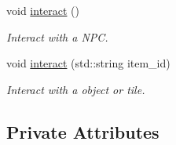 \begin{DoxyCompactItemize}
void \hyperlink{classgame_a61adfafa4d31548fc94c853f10b9bf3b}{interact} ()
\begin{DoxyCompactList}\small\item\em Interact with a N\+PC. \end{DoxyCompactList}\item 
void \hyperlink{classgame_aa78cf955c292ac2bd75fa385a946cd6e}{interact} (std\+::string item\+\_\+id)
\begin{DoxyCompactList}\small\item\em Interact with a object or tile. \end{DoxyCompactList}\end{DoxyCompactItemize}
\subsection*{Private Attributes}
